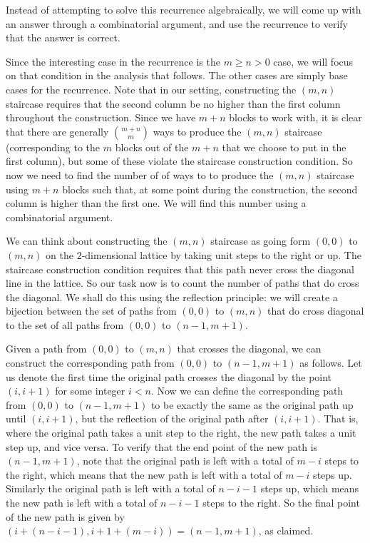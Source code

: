 \documentclass[12pt]{amsart}
\begin{document}
Instead of attempting to solve this recurrence algebraically, we will come up with an answer through a combinatorial argument, and use the recurrence to verify that the answer is correct.

Since the interesting case in the recurrence is the $m \geq n > 0$ case, we will focus on that condition in the analysis that follows. The other cases are simply base cases for the recurrence. Note that in our setting, constructing the $(m,n)$ staircase requires that the second column be no higher than the first column throughout the construction. Since we have $m+n$ blocks to work with, it is clear that there are generally $\binom{m+n}{m}$ ways to produce the $(m,n)$ staircase (corresponding to the $m$ blocks out of the $m+n$ that we choose to put in the first column), but some of these violate the staircase construction condition. So now we need to find the number of of ways to to produce the $(m,n)$ staircase using $m+n$ blocks such that, at some point during the construction, the second column is higher than the first one. We will find this number using a combinatorial argument.

We can think about constructing the $(m,n)$ staircase as going form $(0,0)$ to $(m,n)$ on the $2$-dimensional lattice by taking unit steps to the right or up. The staircase construction condition requires that this path never cross the diagonal line in the lattice. So our task now is to count the number of paths that do cross the diagonal. We shall do this using the reflection principle: we will create a bijection between the set of paths from $(0,0)$ to $(m,n)$ that do cross diagonal to the set of all paths from $(0,0)$ to $(n-1,m+1)$.

Given a path from $(0,0)$ to $(m,n)$ that crosses the diagonal, we can construct the corresponding path from $(0,0)$ to $(n-1,m+1)$ as follows. Let us denote the first time the original path crosses the diagonal by the point $(i,i+1)$ for some integer $i < n$. Now we can define the corresponding path from $(0,0)$ to $(n-1,m+1)$ to be exactly the same as the original path up until $(i,i+1)$, but the reflection of the original path after $(i,i+1)$. That is, where the original path takes a unit step to the right, the new path takes a unit step up, and vice versa. To verify that the end point of the new path is $(n-1,m+1)$, note that the original path is left with a total of $m-i$ steps to the right, which means that the new path is left with a total of $m-i$ steps up. Similarly the original path is left with a total of $n-i-1$ steps up, which means the new path is left with a total of $n-i-1$ steps to the right. So the final point of the new path is given by $(i+(n-i-1), i+1+(m-i)) = (n-1,m+1)$, as claimed.
\end{document}
